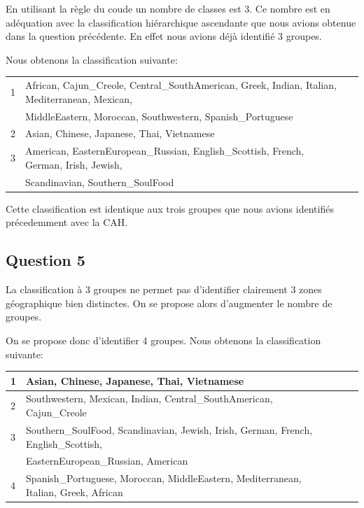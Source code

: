 \documentclass[a4paper,11pt,oneside,roman]{article}
\begin{document}
    En utilisant la règle du coude un nombre de classes est 3.
    Ce nombre est en adéquation avec la classification hiérarchique ascendante que nous avions obtenue dans la question précédente.
    En effet nous avions déjà identifié 3 groupes.

    Nous obtenons la classification suivante:
    \begin{center}
        \begin{tabular}{|l|l|l|}
            \hline
            1 & African, Cajun\_Creole, Central\_SouthAmerican, Greek, Indian, Italian, Mediterranean, Mexican, \\
            & MiddleEastern, Moroccan, Southwestern, Spanish\_Portuguese\\
            \hline
            2 & Asian, Chinese, Japanese, Thai, Vietnamese\\
            \hline
            3 & American, EasternEuropean\_Russian, English\_Scottish, French, German, Irish, Jewish,\\
            & Scandinavian, Southern\_SoulFood\\
            \hline
        \end{tabular}
    \end{center}
    Cette classification est identique aux trois groupes que nous avions identifiés précedemment avec la CAH.

    \subsection*{Question 5}

    La classification à 3 groupes ne permet pas d'identifier clairement 3 zones géographique bien distinctes. On se propose alors d'augmenter le nombre de groupes.

    On se propose donc d'identifier 4 groupes. Nous obtenons la classification suivante:
     \begin{center}
        \begin{tabular}{|l|l|l|l|}
            \hline
            1 & Asian, Chinese, Japanese, Thai, Vietnamese\\
            \hline
            2 & Southwestern, Mexican, Indian, Central\_SouthAmerican, Cajun\_Creole\\
            \hline
            3 & Southern\_SoulFood, Scandinavian, Jewish, Irish, German, French, English\_Scottish, \\
            & EasternEuropean\_Russian, American\\
            \hline
	 4 & Spanish\_Portuguese, Moroccan, MiddleEastern, Mediterranean, Italian, Greek, African\\
            \hline
        \end{tabular}
    \end{center}     
\end{document}
